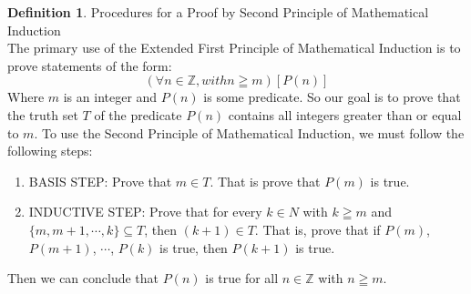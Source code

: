 \documentclass{book}
\theoremstyle{definition}
\newtheorem{definition}{Definition}[section]
\theoremstyle{remark}
\newcommand{\bb}[1]{\mathbb{#1}}
\begin{document}
\newpage
\begin{definition}
Procedures for a Proof by Second Principle of Mathematical Induction \\

The primary use of the Extended First Principle of Mathematical Induction is to prove statements of the form: 
    \begin{equation*}
        (\forall n \in \bb{Z}, with n \geqq m)[P(n)]
    \end{equation*}
Where $m$ is an integer and $P(n)$ is some predicate. So our goal is to prove that the truth set $T$ of the predicate $P(n)$ contains all integers greater than or equal to $m$. To use the Second Principle of Mathematical Induction, we must follow the following steps:

    \begin{enumerate}
        \item BASIS STEP: Prove that $m \in T$. That is prove that $P(m)$ is true.
        \item INDUCTIVE STEP: Prove that for every $k \in N$ with $k \geqq m$ and $ \{m, m+1, \cdots, k \} \subseteq T$, then $(k+1) \in T$. That is, prove that if $P(m)$, $P(m+1)$, $\cdots$, $P(k)$ is true, then $P(k+1)$ is true.
    \end{enumerate}
Then we can conclude that $P(n)$ is true for all $n \in \bb{Z}$ with $n \geqq m$. \\


\end{definition}
\end{document}
